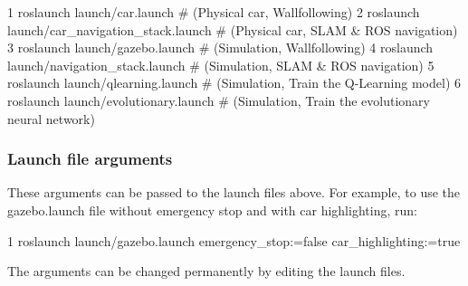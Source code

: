 \begin{DoxyCode}
1 roslaunch launch/car.launch                   # (Physical car, Wallfollowing)
2 roslaunch launch/car\_navigation\_stack.launch  # (Physical car, SLAM & ROS navigation)
3 roslaunch launch/gazebo.launch                # (Simulation, Wallfollowing)
4 roslaunch launch/navigation\_stack.launch      # (Simulation, SLAM & ROS navigation)
5 roslaunch launch/qlearning.launch             # (Simulation, Train the Q-Learning model)
6 roslaunch launch/evolutionary.launch          # (Simulation, Train the evolutionary neural network)
\end{DoxyCode}


\subsubsection*{Launch file arguments}

These arguments can be passed to the launch files above. For example, to use the {\ttfamily gazebo.\+launch} file without emergency stop and with car highlighting, run\+: 
\begin{DoxyCode}
1 roslaunch launch/gazebo.launch emergency\_stop:=false car\_highlighting:=true
\end{DoxyCode}
 The arguments can be changed permanently by editing the launch files.

